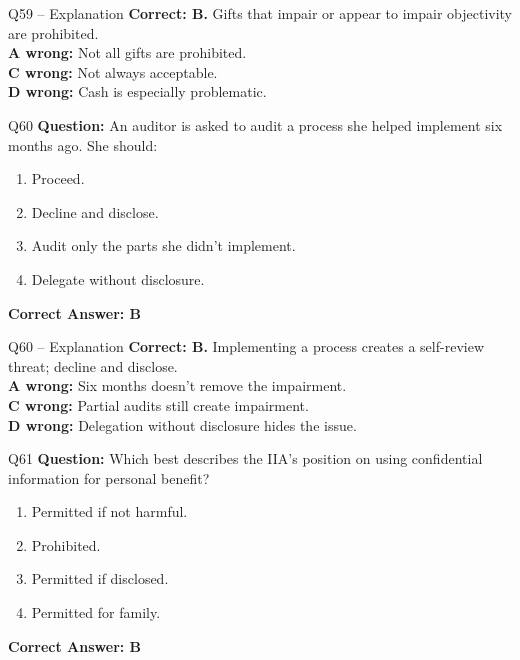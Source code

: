\documentclass[aspectratio=169,10pt]{beamer}
\begin{document}
	\begin{frame}[t]{Q59 -- Explanation}
		\small
		\textbf{Correct: B.} Gifts that impair or appear to impair objectivity are prohibited. \\[4pt]
		\textbf{A wrong:} Not all gifts are prohibited. \\[2pt]
		\textbf{C wrong:} Not always acceptable. \\[2pt]
		\textbf{D wrong:} Cash is especially problematic.
	\end{frame}
	
	\begin{frame}[t]{Q60}
		\small
		\textbf{Question:} An auditor is asked to audit a process she helped implement six months ago. She should:
		\begin{enumerate}[label=\Alph*.,itemsep=1pt,topsep=2pt]
			\item Proceed.
			\item Decline and disclose.
			\item Audit only the parts she didn't implement.
			\item Delegate without disclosure.
		\end{enumerate}
		\vspace{4pt}
		\textbf{Correct Answer: B}
	\end{frame}
	
	\begin{frame}[t]{Q60 -- Explanation}
		\small
		\textbf{Correct: B.} Implementing a process creates a self-review threat; decline and disclose. \\[4pt]
		\textbf{A wrong:} Six months doesn't remove the impairment. \\[2pt]
		\textbf{C wrong:} Partial audits still create impairment. \\[2pt]
		\textbf{D wrong:} Delegation without disclosure hides the issue.
	\end{frame}
	
	\begin{frame}[t]{Q61}
		\small
		\textbf{Question:} Which best describes the IIA's position on using confidential information for personal benefit?
		\begin{enumerate}[label=\Alph*.,itemsep=1pt,topsep=2pt]
			\item Permitted if not harmful.
			\item Prohibited.
			\item Permitted if disclosed.
			\item Permitted for family.
		\end{enumerate}
		\vspace{4pt}
		\textbf{Correct Answer: B}
	\end{frame}
	
\end{document}
